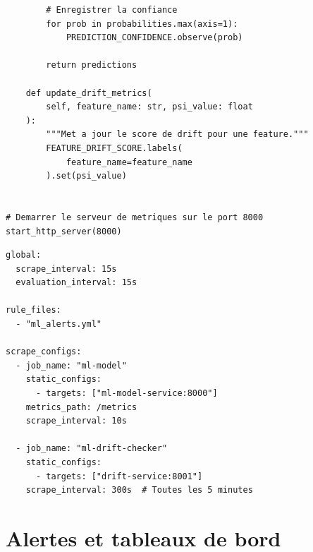 \begin{codeblock}[title=\textbf{Exposer des m\'etriques ML avec Prometheus}]
\begin{verbatim}
        # Enregistrer la confiance
        for prob in probabilities.max(axis=1):
            PREDICTION_CONFIDENCE.observe(prob)

        return predictions

    def update_drift_metrics(
        self, feature_name: str, psi_value: float
    ):
        """Met a jour le score de drift pour une feature."""
        FEATURE_DRIFT_SCORE.labels(
            feature_name=feature_name
        ).set(psi_value)


# Demarrer le serveur de metriques sur le port 8000
start_http_server(8000)
\end{verbatim}
\end{codeblock}

\begin{codeblock}[title=\textbf{Configuration Prometheus \file{prometheus.yml}}]
\begin{verbatim}
global:
  scrape_interval: 15s
  evaluation_interval: 15s

rule_files:
  - "ml_alerts.yml"

scrape_configs:
  - job_name: "ml-model"
    static_configs:
      - targets: ["ml-model-service:8000"]
    metrics_path: /metrics
    scrape_interval: 10s

  - job_name: "ml-drift-checker"
    static_configs:
      - targets: ["drift-service:8001"]
    scrape_interval: 300s  # Toutes les 5 minutes
\end{verbatim}
\end{codeblock}

\section{Alertes et tableaux de bord}
\label{sec:alerts}

